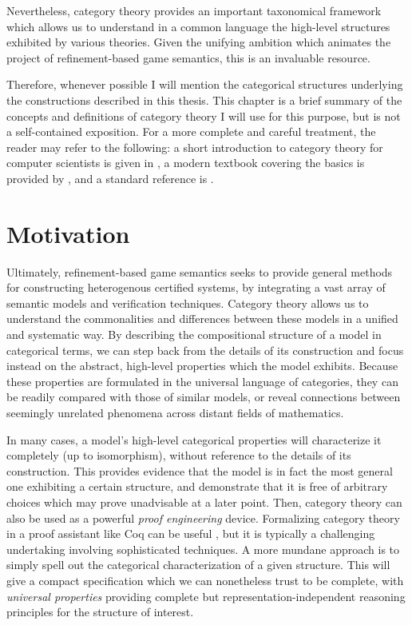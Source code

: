 \documentclass[draft,11pt]{report}
\theoremstyle{definition}
\begin{document}
Nevertheless,
category theory provides an important
taxonomical framework
which allows us to understand
in a common language
the high-level structures
exhibited by various theories.
Given the unifying ambition which animates
the project of
refinement-based game semantics,
this is an invaluable resource.

Therefore,
whenever possible I will mention the categorical structures
underlying the constructions described in this thesis.
This chapter is a brief summary of the concepts and definitions
of category theory I will use for this purpose,
but is not a self-contained exposition.
For a more complete and careful treatment,
the reader may refer to the following:
a short introduction to category theory for computer scientists
is given in \citet{ctcs},
a modern textbook covering the basics is provided by \cite{awodeyct},
and a standard reference is \cite{maclane}.

\section{Motivation} %

Ultimately,
refinement-based game semantics seeks
to provide general methods for
constructing heterogenous certified systems,
by integrating a vast array of
semantic models and verification techniques.
Category theory allows us to
understand the commonalities and differences
between these models
in a unified and systematic way.
By describing the compositional structure of a model
in categorical terms,
we can step back from the details of its construction
and focus instead on
the abstract, high-level properties which the model exhibits.
Because these properties are formulated
in the universal language of categories,
they can be readily compared with those of similar models,
or reveal connections between
seemingly unrelated phenomena across
distant fields of mathematics.

In many cases,
a model's high-level categorical properties
will characterize it completely
(up to isomorphism),
without reference to the details of its construction.
This provides evidence that
the model is in fact the most general one
exhibiting a certain structure,
and demonstrate that it is free of arbitrary choices
which may prove unadvisable at a later point.
%
Then,
category theory can also be used
as a powerful \emph{proof engineering} device.
Formalizing category theory in a proof assistant like Coq
can be useful \citep{math-classes},
but it is typically a challenging undertaking
involving sophisticated techniques.
A more mundane approach
is to simply spell out
the categorical characterization of a given structure.
This will give a compact specification
which we can nonetheless trust to be complete,
with \emph{universal properties}
providing complete but
representation-independent reasoning principles
for the structure of interest.
\end{document}
